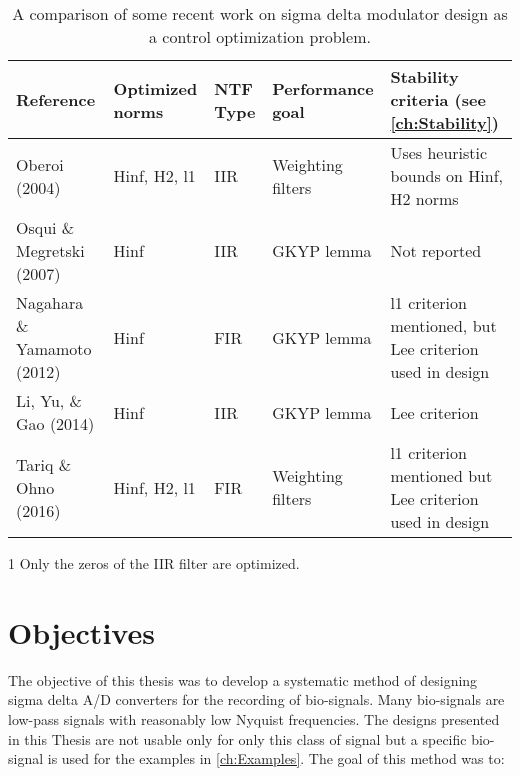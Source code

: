 \begin{table}
\begin{threeparttable}
	\caption{A comparison of some recent work on sigma delta modulator design as a control optimization problem.} \label{tab:related}
	\begin{tabularx}{\textwidth}{X P{1.9cm} P{0.6cm} P{1.9cm} P{3.2cm}}
		\toprule
		\textbf{Reference} & \textbf{Optimized norms} & \textbf{\gls{NTF} Type} & \textbf{Performance goal} & \textbf{Stability criteria (see \autoref{ch:Stability})} \\
		\midrule
		Oberoi (2004) \cite{Oberoi2004} & \gls{Hinf}, \gls{H2}, \gls{l1} &\gls{IIR} &  Weighting filters & Uses heuristic bounds on \gls{Hinf}, \gls{H2} norms \\
		Osqui \& Megretski (2007) \cite{Osqui2007} & \gls{Hinf} & \gls{IIR} & \gls{GKYP} lemma & Not reported \\
		Nagahara \& Yamamoto (2012) \cite{Nagahara2012} & \gls{Hinf} & \gls{FIR} & \gls{GKYP} lemma & \gls{l1} criterion mentioned, but Lee criterion used in design \\
		Li, Yu, \& Gao (2014) \cite{Li2014} & \gls{Hinf} & \gls{IIR} & \gls{GKYP} lemma & Lee criterion \\
		Tariq \& Ohno (2016) \cite{Tariq2016} & \gls{Hinf}, \gls{H2}, \gls{l1} & \gls{FIR} & Weighting filters & \gls{l1} criterion mentioned but Lee criterion used in design \\
		\bottomrule
	\end{tabularx}
	\begin{tablenotes}
		\item[1] Only the zeros of the \gls{IIR} filter are optimized.
	\end{tablenotes}
\end{threeparttable}
\end{table}

\section{Objectives}
\label{sec:in-obj}

The objective of this thesis was to develop a systematic method of designing sigma delta \gls{A/D} converters for the recording of bio-signals. Many bio-signals are low-pass signals with reasonably low Nyquist frequencies. The designs presented in this Thesis are not usable only for only this class of signal but a specific bio-signal is used for the examples in \autoref{ch:Examples}. The goal of this method was to:

